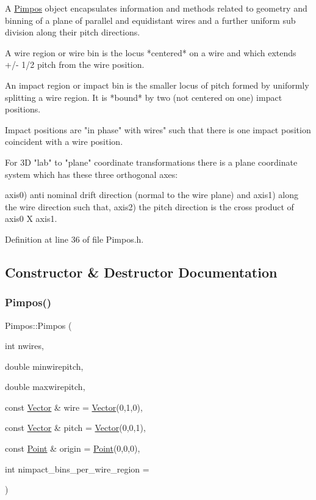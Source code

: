 A \hyperlink{class_wire_cell_1_1_pimpos}{Pimpos} object encapsulates information and methods related to geometry and binning of a plane of parallel and equidistant wires and a further uniform sub division along their pitch directions. \begin{DoxyVerb}A wire region or wire bin is the locus *centered* on a wire
and which extends +/- 1/2 pitch from the wire position.

An impact region or impact bin is the smaller locus of pitch
formed by uniformly splitting a wire region.  It is *bound* by
two (not centered on one) impact positions.

Impact positions are "in phase" with wires" such that there is
one impact position coincident with a wire position.

For 3D "lab" to "plane" coordinate transformations there is a
plane coordinate system which has these three orthogonal axes:
\end{DoxyVerb}


axis0) anti nominal drift direction (normal to the wire plane) and axis1) along the wire direction such that, axis2) the pitch direction is the cross product of axis0 X axis1. 

Definition at line 36 of file Pimpos.\+h.



\subsection{Constructor \& Destructor Documentation}
\mbox{\label{class_wire_cell_1_1_pimpos_a3cced28a957f1b3f9610166e29441934}} 
\subsubsection{\texorpdfstring{Pimpos()}{Pimpos()}}
{\footnotesize\ttfamily Pimpos\+::\+Pimpos (\begin{DoxyParamCaption}\item[{int}]{nwires,  }\item[{double}]{minwirepitch,  }\item[{double}]{maxwirepitch,  }\item[{const \hyperlink{namespace_wire_cell_aa3c82d3ba85f032b0d278b7004846800}{Vector} \&}]{wire = {\ttfamily \hyperlink{namespace_wire_cell_aa3c82d3ba85f032b0d278b7004846800}{Vector}(0,1,0)},  }\item[{const \hyperlink{namespace_wire_cell_aa3c82d3ba85f032b0d278b7004846800}{Vector} \&}]{pitch = {\ttfamily \hyperlink{namespace_wire_cell_aa3c82d3ba85f032b0d278b7004846800}{Vector}(0,0,1)},  }\item[{const \hyperlink{namespace_wire_cell_ab2b2565fa6432efbb4513c14c988cda9}{Point} \&}]{origin = {\ttfamily \hyperlink{namespace_wire_cell_ab2b2565fa6432efbb4513c14c988cda9}{Point}(0,0,0)},  }\item[{int}]{nimpact\+\_\+bins\+\_\+per\+\_\+wire\+\_\+region = {} }\end{DoxyParamCaption})}

